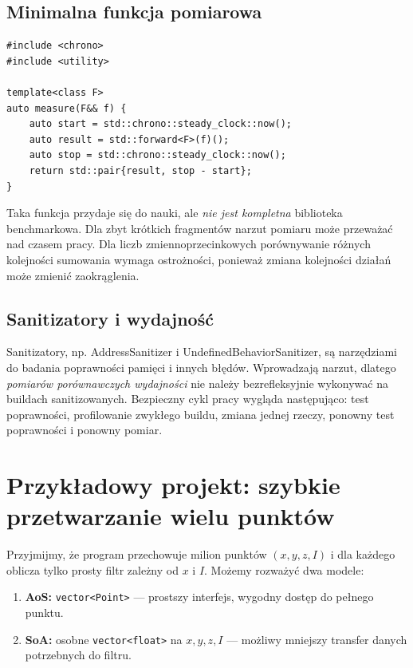 \subsection{Minimalna funkcja pomiarowa}

\begin{lstlisting}
#include <chrono>
#include <utility>

template<class F>
auto measure(F&& f) {
    auto start = std::chrono::steady_clock::now();
    auto result = std::forward<F>(f)();
    auto stop = std::chrono::steady_clock::now();
    return std::pair{result, stop - start};
}
\end{lstlisting}

Taka funkcja przydaje się do nauki, ale \emph{nie jest kompletna}
biblioteka benchmarkowa. Dla zbyt krótkich fragmentów narzut
pomiaru może przeważać nad czasem pracy. Dla liczb zmiennoprzecinkowych
porównywanie różnych kolejności sumowania wymaga ostrożności,
ponieważ zmiana kolejności działań może zmienić zaokrąglenia.

\subsection{Sanitizatory i wydajność}

Sanitizatory, np. AddressSanitizer i UndefinedBehaviorSanitizer,
są narzędziami do badania poprawności pamięci i innych błędów.
Wprowadzają narzut, dlatego \emph{pomiarów porównawczych wydajności}
nie należy bezrefleksyjnie wykonywać na buildach sanitizowanych.
Bezpieczny cykl pracy wygląda następująco: test poprawności,
profilowanie zwykłego buildu, zmiana jednej rzeczy, ponowny test
poprawności i ponowny pomiar.

\section{Przykładowy projekt: szybkie przetwarzanie wielu punktów}
\label{sec:cpp10-project}

Przyjmijmy, że program przechowuje milion punktów \((x,y,z,I)\)
i dla każdego oblicza tylko prosty filtr zależny od \(x\) i \(I\).
Możemy rozważyć dwa modele:
\begin{enumerate}
\item \textbf{AoS:} \texttt{vector<Point>} --- prostszy interfejs,
      wygodny dostęp do pełnego punktu.
\item \textbf{SoA:} osobne \texttt{vector<float>} na \(x,y,z,I\) ---
      możliwy mniejszy transfer danych potrzebnych do filtru.
\end{enumerate}

